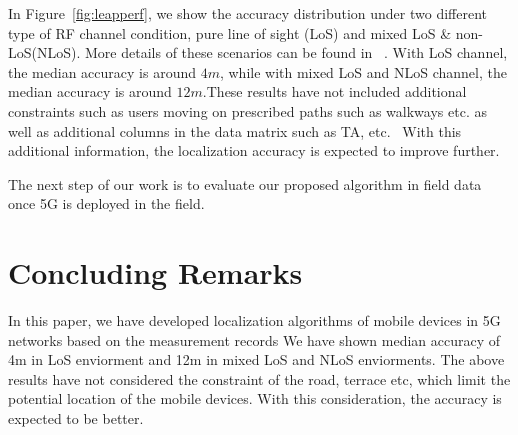 \documentclass[conference, 10pt]{IEEEtran}
\begin{document}
\begin{NoHyper}
In Figure~\ref{fig:leapperf}, we show the
accuracy distribution under two different type of RF channel condition, pure line of sight (LoS) and mixed LoS \& non-LoS(NLoS). More details of these scenarios can be found in 
~\cite{3gpp38901}. With LoS channel, the median accuracy is around
$4m$, while with mixed LoS and NLoS channel, the median accuracy is around $12m$.These results have not included additional constraints such as users moving on prescribed paths such as walkways etc. as well as additional columns in the data matrix such as TA, etc. 
With this additional information, the localization accuracy is expected to improve further. 

The next step of our work is to evaluate our proposed algorithm in field data once 5G is deployed in the field. 

\section{Concluding Remarks}
\label{sec:concl}

In this paper, we have developed localization algorithms of mobile devices in 5G networks based on the measurement records 
We have shown median accuracy of 4m in LoS enviorment and 12m in mixed LoS and NLoS enviorments. 
The above results have not considered the constraint of the road, terrace etc, which limit the potential location of the mobile devices. With this consideration,
the accuracy is expected to be better.  




%
%    

{%


}

\end{NoHyper}
\end{document}
